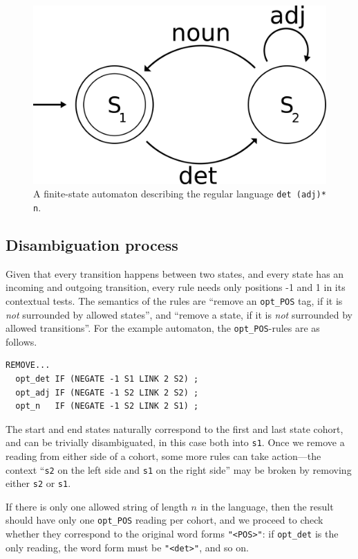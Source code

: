 \documentclass[11pt]{article}
\def\t#1{\texttt{#1}}
\def\maxAmbFSA#1{$\langle \Sigma,S \rangle_#1$}
\begin{document}
\begin{figure}[t]
  \centering
    \includegraphics[width=0.6\linewidth]{fsa.png}
  \caption{A finite-state automaton describing the regular language \t{det (adj)* n}.}
 \label{fig:fsa}
\end{figure}


\subsection{Disambiguation process}

Given that every transition happens between two states, and every state 
has an incoming and outgoing transition, every rule needs only
positions -1 and 1 in its contextual tests. 
The semantics of the rules are ``remove an \t{opt\_POS} tag, if it is 
\emph{not} surrounded by allowed states'',
and ``remove a state, if it is \emph{not} surrounded by allowed transitions''.
For the example automaton, the \t{opt\_POS}-rules are as follows.

\begin{verbatim}
REMOVE...
  opt_det IF (NEGATE -1 S1 LINK 2 S2) ;
  opt_adj IF (NEGATE -1 S2 LINK 2 S2) ;
  opt_n   IF (NEGATE -1 S2 LINK 2 S1) ;
\end{verbatim}

\noindent The start and end states naturally correspond to the first and last state cohort, 
and can be trivially disambiguated, in this case both into \t{s1}.
Once we remove a reading from either side of a cohort, some more rules 
can take action---the context ``\t{s2} on the left side and \t{s1} on the right side''
may be broken by removing either \t{s2} or \t{s1}.

If there is only one allowed string of length $n$ in the language, 
then the result should have only one \t{opt\_POS} reading per cohort,
and we proceed to check whether they correspond to the original word forms \t{"<POS>"}: 
if \t{opt\_det} is the only reading, the word form must be \t{"<det>"}, and so on.
\end{document}
